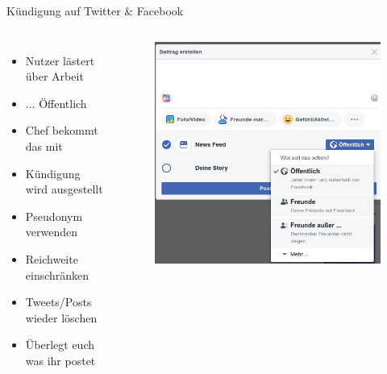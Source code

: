 \documentclass[10pt]{beamer}
\begin{document}
\begin{frame}[fragile]{Kündigung auf Twitter \& Facebook}
\begin{columns}[T,c,onlytextwidth]
  \begin{itemize}
    \item Nutzer lästert über Arbeit
    \item ... Öffentlich
    \item Chef bekommt das mit
    \item Kündigung wird ausgestellt
    \item \alert{Pseudonym verwenden}
    \item \alert{Reichweite einschränken}
    \item \alert{Tweets/Posts wieder löschen}
    \item \alert{Überlegt euch was ihr postet}
  \end{itemize}
	\begin{figure}
		\includegraphics[width=1\textwidth]{images/facebook}
	\end{figure}
\end{columns}
\end{frame}
\end{document}
